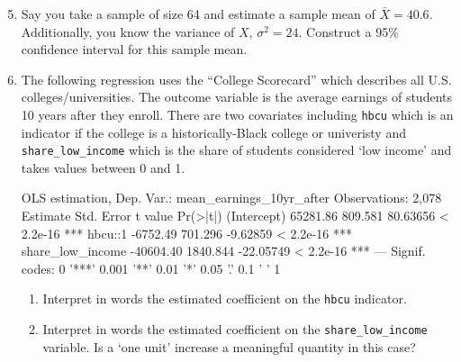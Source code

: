 \documentclass[12pt]{article}
\begin{document}
\newpage
\begin{enumerate}
  \setcounter{enumi}{4}
  \item Say you take a sample of size 64 and estimate a sample mean of $\bar{X} = 40.6$. Additionally, you know the variance of $X$, $\sigma^2 = 24$. Construct a 95\% confidence interval for this sample mean. 

  \bigskip
  \item The following regression uses the ``College Scorecard'' which describes all U.S. colleges/universities. The outcome variable is the average earnings of students 10 years after they enroll. There are two covariates including \texttt{hbcu} which is an indicator if the college is a historically-Black college or univeristy and \texttt{share\_low\_income} which is the share of students considered `low income' and takes values between 0 and 1.
  \begin{codeblock}[{}]
OLS estimation, Dep. Var.: mean_earnings_10yr_after
Observations: 2,078
                  Estimate Std. Error   t value  Pr(>|t|)    
(Intercept)       65281.86    809.581  80.63656 < 2.2e-16 ***
hbcu::1           -6752.49    701.296  -9.62859 < 2.2e-16 ***
share_low_income -40604.40   1840.844 -22.05749 < 2.2e-16 ***
---
Signif. codes:  0 '***' 0.001 '**' 0.01 '*' 0.05 '.' 0.1 ' ' 1
  \end{codeblock}

  \begin{enumerate}[leftmargin = 2em]
    \item Interpret in words the estimated coefficient on the \texttt{hbcu} indicator. 
    
    \item Interpret in words the estimated coefficient on the \texttt{share\_low\_income} variable. Is a `one unit' increase a meaningful quantity in this case?
  \end{enumerate}
\end{enumerate}
\end{document}
